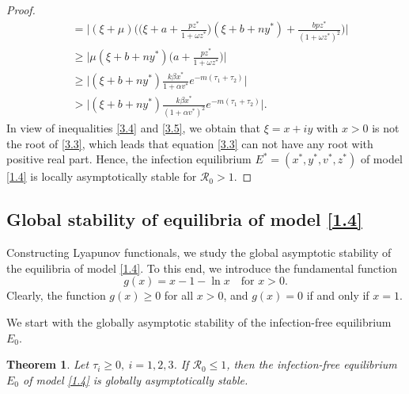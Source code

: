 \documentclass[10pt,a4paper]{amsart}
\numberwithin{equation}{section}
\newtheorem{theorem}{Theorem}[section]
\begin{document}
\begin{proof}
\begin{equation}
\begin{aligned}
&= \Big|(\xi+\mu)\Big(\Big(\xi+a+{\frac{pz^{*}}{1+\omega z^{*}}}\Big)
 (\xi+b+ny^{*})+{\frac{bpz^{*}}{(1+\omega z^{*})^{2}}}\Big)\Big|  \\
&\geqslant \Big|\mu(\xi+b+ny^{*})\Big(a+\frac{pz^*}{1+\omega z^*}\Big)\Big|    \\
&\geqslant \Big|(\xi+b+ny^{*})\frac{k\beta x^{*}}{1+\alpha v^{*}}
 e^{-m(\tau_1+\tau_2)}\Big|     \\
&> \Big|(\xi+b+ny^{*})\frac{k\beta x^{*}}{(1+\alpha v^{*})^{2}}
 e^{-m(\tau_1+\tau_2)}\Big|.
\end{aligned}
\end{equation}
In view of inequalities \eqref{3.4} and \eqref{3.5}, we obtain that $\xi=x+iy$ with $x>0$
is not the root of \eqref{3.3}, which leads that
equation \eqref{3.3} can not have any root with positive real part.
Hence, the  infection equilibrium $E^{*}=(x^{*},y^{*},v^{*},z^{*})$ of model \eqref{1.4}
is locally asymptotically stable for $\mathcal{R}_0>1$.
\end{proof}


\subsection{Global stability of equilibria of model \eqref{1.4}}

Constructing Lyapunov functionals, we study the global asymptotic stability of 
the  equilibria of model \eqref{1.4}.
To this end,  we introduce the fundamental function
$$
g(x)=x-1-\ln x \quad \text{for }  x>0.
$$
Clearly, the function $g(x) \geqslant$0 for all $x>0$, and $g(x)=0$ if and only 
if $x=1$.

We start with the globally  asymptotic stability of the infection-free  
equilibrium $E_0$.

\begin{theorem}\label{T3.3}
Let $\tau_{i}\geqslant0,\ i=1,2,3$.  If $\mathcal{R}_0\leq 1$, then the 
infection-free equilibrium  $E_0$ of model \eqref{1.4} is globally asymptotically stable.
\end{theorem}
\end{document}
